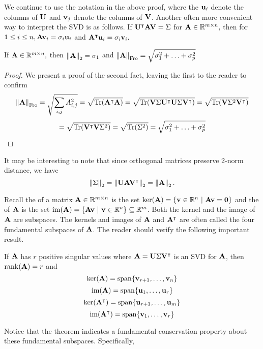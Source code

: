 We continue to use the notation in the above proof, where the $\vu_i$ denote the columns of $\MU$ and $\vv_j$ denote the columns of $\MV$. Another often more convenient way to interpret the SVD is as follows.
If $\MU^\intercal \MA \MV = \Sigma$ for $\MA \in \mathbb R^{m \times n},$ then for $1 \leq i \leq n, \MA\vv_i = \sigma_i \vu_i$ and $\MA^\intercal \vu_i = \sigma_i \vv_i.$


\begin{proposition}
If $\MA \in \mathbb R^{m \times n},$ then $\norm{\MA}_2 = \sigma_1$ and $\norm{\MA}_{\Fro} = \sqrt{\sigma_1^2 + \ldots + \sigma_p^2}$
\end{proposition}

\begin{proof}
We present a proof of the second fact, leaving the first to the reader to confirm
$$\norm{\MA}_{\Fro} = \sqrt{\sum_{i,j} A_{i,j}^2} = \sqrt{\trace(\MA^\intercal\MA)} = \sqrt{\trace(\MV \Sigma \MU^\intercal \MU \Sigma \MV^\intercal)} = \sqrt{\trace(\MV \Sigma^2 \MV^\intercal)} $$
$$ = \sqrt{\trace(\MV^\intercal\MV \Sigma^2)} = \sqrt{\trace(\Sigma^2)} = \sqrt{\sigma_1^2 + \ldots + \sigma_p^2}$$
\end{proof}

It may be interesting to note that since orthogonal matrices preserve 2-norm distance, we have
$$\norm{\Sigma}_2 = \norm{\MU\MA\MV^\intercal}_2 = \norm{\MA}_2.$$

Recall the  of a matrix $\MA\in\R^{m\times n}$ is the set $\kernel(\MA) = \{\vv\in\R^n \ | \ \MA\vv = \vzero\}$ and the  of $\MA$ is the set $\image(\MA) = \{\MA\vv \ | \ \vv\in\R^n\}\subseteq \R^m$. Both the kernel and the image of $\MA$ are subspaces. The kernels and images of $\MA$ and $\MA^\intercal$ are often called the four fundamental subspaces of $\MA$. The reader should verify the following important result.
\begin{theorem}
If $\MA$ has $r$ positive singular values where $\MA = \MU\Sigma\MV^\intercal$ is an SVD for $\MA$, then $\rank(\MA) = r$ and 
$$\kernel(\MA) = \spann \{ \vv_{r+1}, \ldots, \vv_n \}$$
$$\image(\MA) = \spann \{ \vu_1, \ldots, \vu_r \}$$
$$\kernel(\MA^\intercal) = \spann \{ \vu_{r+1}, \ldots, \vu_m \}$$
$$\image(\MA^\intercal) = \spann \{ \vv_1, \ldots, \vv_r \}$$
\end{theorem}

Notice that the theorem indicates a fundamental conservation property about these fundamental subspaces. Specifically, 

